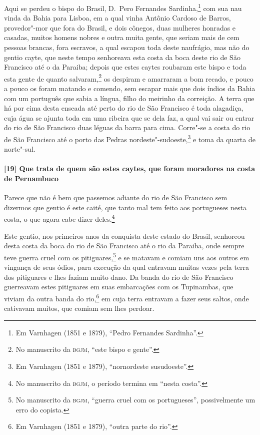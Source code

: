Aqui se perdeu o bispo do Brasil, D.~Pero Fernandes Sardinha,\footnote{ Em Varnhagen (1851
e 1879), ``Pedro Fernandes Sardinha''.} com sua nau vinda da Bahia para Lisboa, em a qual
vinha Antônio Cardoso de Barros, provedor"-mor que fora do Brasil, e dois cônegos, duas
mulheres honradas e casadas, muitos homens nobres e outra muita gente, que seriam mais de
cem pessoas brancas, fora escravos, a qual escapou toda deste naufrágio, mas não do gentio
cayte, que neste tempo senhoreava esta costa da boca deste rio de São Francisco até o da
Paraiba; depois que estes caytes roubaram este bispo e toda esta gente de quanto
salvaram,\footnote{ No manuscrito da \textsc{bgjm}, ``este bispo e gente''.} os despiram e
amarraram a bom recado, e pouco a pouco os foram matando e comendo, sem escapar mais que
dois índios da Bahia com um português que sabia a língua, filho do meirinho da correição.
A terra que há por cima desta enseada até perto do rio de São Francisco é toda alagadiça,
cuja água se ajunta toda em uma ribeira que se dela faz, a qual vai sair ou entrar do rio
de São Francisco duas léguas da barra para cima. Corre"-se a costa do rio de São Francisco
até o porto das Pedras nordeste"-sudoeste,\footnote{ Em Varnhagen (1851 e 1879),
``nornordeste susudoeste''.} e toma da quarta de norte"-sul.

\paragraph{[19] Que trata de quem são estes caytes, que foram moradores na costa de
Pernambuco} \quad
Parece que não é bem que passemos adiante do rio de São Francisco sem dizermos que gentio
é este caité, que tanto mal tem feito aos portugueses nesta costa, o que agora cabe dizer
deles.\footnote{ No manuscrito da \textsc{bgjm}, o período termina em ``nesta costa''.}

Este gentio, nos primeiros anos da conquista deste estado do Brasil, senhoreou desta costa
da boca do rio de São Francisco até o rio da Paraiba, onde sempre teve guerra cruel com os
pitiguares,\footnote{ No manuscrito da \textsc{bgjm}, ``guerra cruel com os portugueses'',
possivelmente um erro do copista.} e se matavam e comiam uns aos outros em vingança de
seus ódios, para execução da qual entravam muitas vezes pela terra dos pitiguares e lhes
faziam muito dano. Da banda do rio de São Francisco guerreavam estes pitiguares em suas
embarcações com os Tupinambas, que viviam da outra banda do rio,\footnote{ Em Varnhagen
(1851 e 1879), ``outra parte do rio''.} em cuja terra entravam a fazer seus saltos, onde
cativavam muitos, que comiam sem lhes perdoar.

